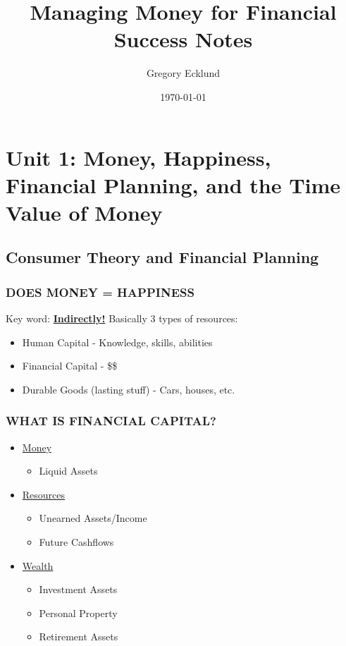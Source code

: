 \documentclass[12pt]{article}
\title{Managing Money for Financial Success Notes}
\author{Gregory Ecklund}
\date{\today}
\begin{document}
    \maketitle
    \tableofcontents
    \newpage

    \section{Unit 1: Money, Happiness, Financial Planning, and the Time Value of Money}

        \subsection{Consumer Theory and  Financial Planning}
            \subsubsection{DOES MONEY = HAPPINESS}
                Key word: \textbf{\underline{Indirectly!}}
                Basically 3 types of resources:
                \begin{itemize}
                    \item Human Capital - Knowledge, skills, abilities
                    \item Financial Capital - \$\$
                    \item Durable Goods (lasting stuff) - Cars, houses, etc.
                \end{itemize}
            \subsubsection{WHAT IS FINANCIAL CAPITAL?}
                \begin{itemize}
                    \item \underline{Money}
                        \begin{itemize}
                            \item Liquid Assets
                        \end{itemize}
                    \item \underline{Resources}
                        \begin{itemize}
                            \item Unearned Assets/Income
                            \item Future Cashflows
                        \end{itemize}
                    \item \underline{Wealth}
                        \begin{itemize}
                            \item Investment Assets
                            \item Personal Property
                            \item Retirement Assets
                        \end{itemize}
                \end{itemize}
\end{document}
